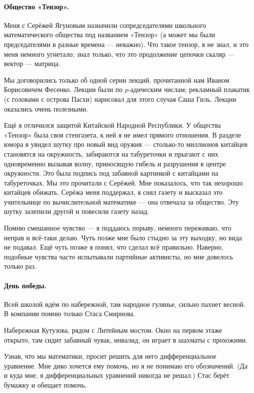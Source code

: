 \documentclass{book}
\begin{document}
\paragraph{Общество «Тензор».}
Меня с Серёжей Ягуновым назначили сопредседателями школьного математического общества под названием «Тензор» (а может мы были председателями в разные времена --- неважно).
Что такое тензор, я не знал, и это меня немного угнетало;
знал только, что это продолжение цепочки скаляр --- вектор --- матрица.

Мы договорились только об одной серии лекций, прочитанной нам Иваном Борисовичем Фесенко.
Лекции были по $p$-адическим числам; 
рекламный плакатик (с головами с острова Пасхи) нарисовал для этого случая Саша Гиль.
Лекции оказались очень полезными.

Ещё я отличился защитой Китайской Народной Республики.
У общества «Тензор» была своя стенгазета, к ней я не имел прямого отношения.
В разделе юмора я увидел шутку про новый вид оружия --- столько-то миллионов китайцев становятся на окружность, забираются на табуреточки и прыгают с них одновременно вызывая волну, приносящую гибель и разрушения в центре окружности.
Это была подпись под забавной картинкой с китайцами на табуреточках.
Мы это прочитали с Серёжей.
Мне показалось, что так нехорошо китайцев обижать.
Серёжа меня поддержал, я снял газету и высказал это учительнице по вычислительной математике --- она отвечала за общество.
Эту шутку залепили другой и повесили газету назад.

Помню смешанное чувство --- я поддаюсь порыву, немного переживаю, что неправ и всё-таки делаю.
Чуть позже мне было стыдно за эту выходку, но вида не подавал.
Ещё чуть позже я понял, что сделал всё правильно.
Наверно, подобные чувства часто испытывали партийные активисты, но мне довелось только раз.

\paragraph{День победы.} 
Всей школой идём по набережной, там народное гулянье, сильно пахнет весной.
В компании помню только Стаса Смирнова.

Набережная Кутузова, рядом с Литейным мостом.
Окно на первом этаже открыто,
там сидит забавный чувак, инвалид, он играет в шахматы с прохожими.

Узнав, что мы математики, просит решить для него дифференциальное уравнение.
Мне дико хочется ему помочь, но я не понимаю его обозначений.
(Да и куда мне, я дифференциальных уравнений никогда не решал.)
Стас берёт бумажку и обещает помочь.
\end{document}
